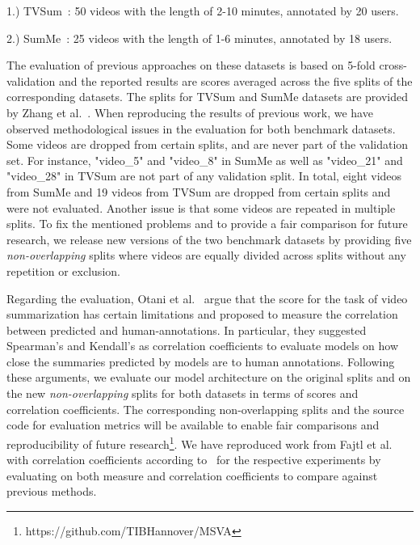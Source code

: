 \documentclass{article}
\begin{document}
1.) TVSum~\cite{DBLP:conf/cvpr/SongVSJ15}: 50 videos with the length of 2-10 minutes, annotated by 20 users.
  
    
2.) SumMe~\cite{DBLP:conf/eccv/ZhangCSG16}: \num{25} videos with the length of 1-6 minutes, annotated by 18 users.

The evaluation of previous approaches on these datasets is based on 5-fold cross-validation and the reported results are  scores averaged across the five splits of the corresponding datasets. The splits for TVSum and SumMe datasets are provided by Zhang et al.~\cite{DBLP:conf/eccv/ZhangCSG16}. When reproducing the results of previous work, we have observed methodological issues in the evaluation for both benchmark datasets. Some videos are dropped from certain splits, and are never part of the validation set. For instance, "video\_5" and "video\_8" in SumMe as well as "video\_21" and "video\_28" in TVSum are not part of any validation split. In total, eight videos from SumMe and \num{19} videos from TVSum are dropped from certain splits and were not evaluated. Another issue is that some videos are repeated in multiple splits. To fix the mentioned problems and to provide a fair comparison for future research, we release new versions of the two benchmark datasets by providing five \textit{non-overlapping} splits where videos are equally divided across splits without any repetition or exclusion.

Regarding the evaluation, Otani et al.~\cite{DBLP:conf/cvpr/OtaniNRH19} argue that the  score for the task of video summarization has certain limitations and proposed to measure the correlation between predicted and human-annotations.
In particular, they suggested Spearman’s  and Kendall’s  as correlation coefficients to evaluate models on how close the summaries predicted by models are to human annotations. Following these arguments, we evaluate our model architecture on the original splits and on the new \textit{non-overlapping} splits for both datasets in terms of  scores and correlation coefficients. 
The corresponding non-overlapping splits and the source code for evaluation metrics will be available to enable fair comparisons and reproducibility of future research\footnote{https://github.com/TIBHannover/MSVA}.  
We have reproduced work from Fajtl et al.~\cite{DBLP:conf/accv/FajtlSAMR18} with correlation coefficients according to~\cite{DBLP:journals/corr/abs-2006-01410, DBLP:conf/cvpr/OtaniNRH19} for the respective experiments by evaluating on both  measure and correlation coefficients to compare against previous methods.
\end{document}
